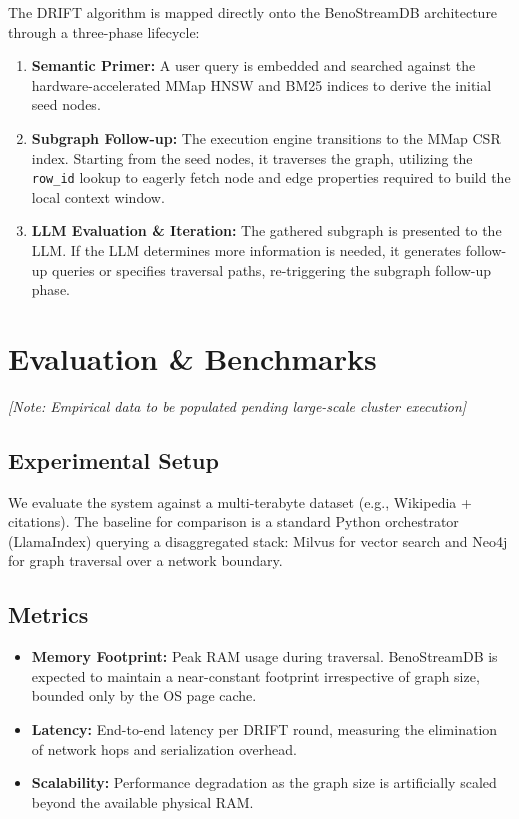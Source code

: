 \documentclass[11pt,twocolumn]{article}
\begin{document}
The DRIFT algorithm is mapped directly onto the BenoStreamDB architecture through a three-phase lifecycle:
\begin{enumerate}
    \item \textbf{Semantic Primer:} A user query is embedded and searched against the hardware-accelerated MMap HNSW and BM25 indices to derive the initial seed nodes.
    \item \textbf{Subgraph Follow-up:} The execution engine transitions to the MMap CSR index. Starting from the seed nodes, it traverses the graph, utilizing the \texttt{row\_id} lookup to eagerly fetch node and edge properties required to build the local context window.
    \item \textbf{LLM Evaluation \& Iteration:} The gathered subgraph is presented to the LLM. If the LLM determines more information is needed, it generates follow-up queries or specifies traversal paths, re-triggering the subgraph follow-up phase.
\end{enumerate}

\section{Evaluation \& Benchmarks}
\textit{[Note: Empirical data to be populated pending large-scale cluster execution]}

\subsection{Experimental Setup}
We evaluate the system against a multi-terabyte dataset (e.g., Wikipedia + citations). The baseline for comparison is a standard Python orchestrator (LlamaIndex) querying a disaggregated stack: Milvus for vector search and Neo4j for graph traversal over a network boundary.

\subsection{Metrics}
\begin{itemize}
    \item \textbf{Memory Footprint:} Peak RAM usage during traversal. BenoStreamDB is expected to maintain a near-constant footprint irrespective of graph size, bounded only by the OS page cache.
    \item \textbf{Latency:} End-to-end latency per DRIFT round, measuring the elimination of network hops and serialization overhead.
    \item \textbf{Scalability:} Performance degradation as the graph size is artificially scaled beyond the available physical RAM.
\end{itemize}
\end{document}
